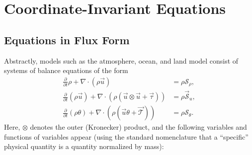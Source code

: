 \documentclass{report}
\begin{document}
\section{Coordinate-Invariant Equations}

\subsection{Equations in Flux Form}

Abstractly, models such as the atmosphere, ocean, and land model consist of systems of balance equations of the form 
\begin{subequations}\label{e:balance_equations}
\begin{align}
     \frac{\partial}{\partial t} \rho + \nabla \cdot \left( \rho \vec{u} \right)
    & = \rho \mathcal{S}_\rho, \label{e:continuity}\\
   \frac{\partial}{\partial t} (\rho \vec{u})
    + \nabla \cdot \left( \rho (\vec{u} \otimes \vec{u} + \vec{\tau}) \right)
    & = \rho \vec{\mathcal{S}}_u,\\
     \frac{\partial}{\partial t} (\rho \theta) + \nabla \cdot \left(\rho (\vec{u}\theta + \vec{\mathcal{T}}) \right)
    & = \rho \mathcal{S}_\theta.
\end{align}
\end{subequations}
Here, $\otimes$ denotes the outer (Kronecker) product, and the following variables and functions of variables appear (using the standard nomenclature that a ``specific'' physical quantity is a quantity normalized by mass):
\end{document}
